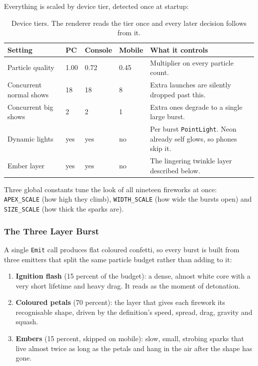 \documentclass[12pt,letterpaper]{article}
\begin{document}
Everything is scaled by device tier, detected once at startup:

\begin{table}[H]
\centering
\footnotesize
\begin{tabular}{|p{3.2cm}|p{2.2cm}|p{2.2cm}|p{2.2cm}|p{4.4cm}|}
\hline
\textbf{Setting} & \textbf{PC} & \textbf{Console} & \textbf{Mobile} & \textbf{What it controls} \\
\hline
Particle quality & 1.00 & 0.72 & 0.45 & Multiplier on every particle count. \\
\hline
Concurrent normal shows & 18 & 18 & 8 & Extra launches are silently dropped past this. \\
\hline
Concurrent big shows & 2 & 2 & 1 & Extra ones degrade to a single large burst. \\
\hline
Dynamic lights & yes & yes & no & Per burst \texttt{PointLight}. Neon already self glows, so phones skip it. \\
\hline
Ember layer & yes & yes & no & The lingering twinkle layer described below. \\
\hline
\end{tabular}
\caption{Device tiers. The renderer reads the tier once and every later decision follows from it.}
\end{table}

Three global constants tune the look of all nineteen fireworks at once: \texttt{APEX\_SCALE} (how high they climb), \texttt{WIDTH\_SCALE} (how wide the bursts open) and \texttt{SIZE\_SCALE} (how thick the sparks are).

\subsubsection{The Three Layer Burst}

A single \texttt{Emit} call produces flat coloured confetti, so every burst is built from three emitters that split the same particle budget rather than adding to it:

\begin{enumerate}
  \item \textbf{Ignition flash} (15 percent of the budget): a dense, almost white core with a very short lifetime and heavy drag. It reads as the moment of detonation.
  \item \textbf{Coloured petals} (70 percent): the layer that gives each firework its recognisable shape, driven by the definition's speed, spread, drag, gravity and squash.
  \item \textbf{Embers} (15 percent, skipped on mobile): slow, small, strobing sparks that live almost twice as long as the petals and hang in the air after the shape has gone.
\end{enumerate}
\end{document}
